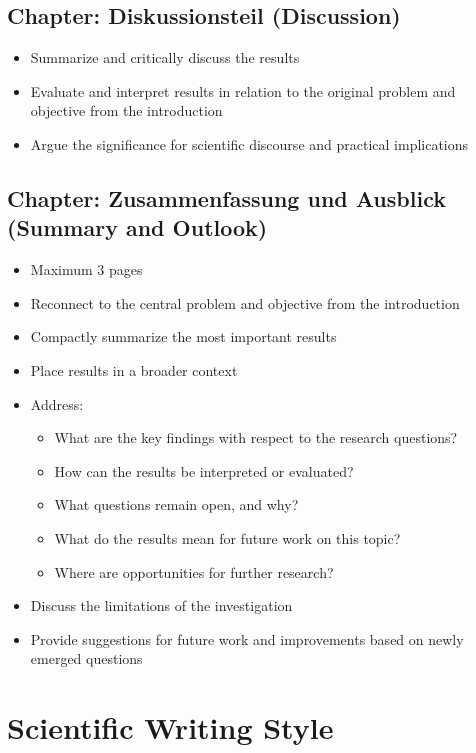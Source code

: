 \subsection{Chapter: Diskussionsteil (Discussion)}
\begin{itemize}
    \item Summarize and critically discuss the results
    \item Evaluate and interpret results in relation to the original problem and objective from the introduction
    \item Argue the significance for scientific discourse and practical implications
\end{itemize}

\subsection{Chapter: Zusammenfassung und Ausblick (Summary and Outlook)}
\begin{itemize}
    \item Maximum 3 pages
    \item Reconnect to the central problem and objective from the introduction
    \item Compactly summarize the most important results
    \item Place results in a broader context
    \item Address:
    \begin{itemize}
        \item What are the key findings with respect to the research questions?
        \item How can the results be interpreted or evaluated?
        \item What questions remain open, and why?
        \item What do the results mean for future work on this topic?
        \item Where are opportunities for further research?
    \end{itemize}
    \item Discuss the limitations of the investigation
    \item Provide suggestions for future work and improvements based on newly emerged questions
\end{itemize}


\section{Scientific Writing Style}

